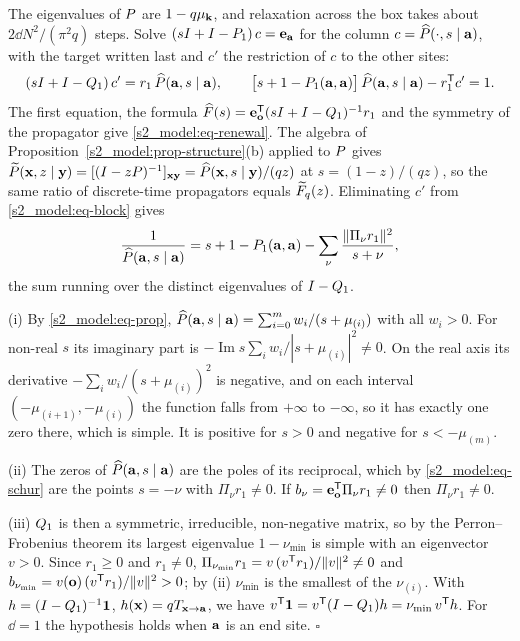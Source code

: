 The eigenvalues of $P$ are $1-q\mu_{\mathbf{k}}$, and relaxation across the box takes about $2\dd N^{2}/(\pi^{2}q)$ steps.
Solve $(sI+I-P_1)\,c=\mathbf{e}_{\mathbf{a}}$ for the column $c=\widehat{P}(\cdot,s\mid\mathbf{a})$, with the target written last and $c'$
the restriction of $c$ to the other sites:
\begin{equation}\label{s2_model:eq-block}
  (sI+I-Q_1)\,c'=r_1\,\widehat{P}(\mathbf{a},s\mid\mathbf{a}),\qquad
  \bigl[s+1-P_1(\mathbf{a},\mathbf{a})\bigr]\,\widehat{P}(\mathbf{a},s\mid\mathbf{a})-r_1^{\mathsf{T}}c'=1 .
\end{equation}
The first equation, the formula $\widehat{F}(s)=\mathbf{e}_{\mathbf{o}}^{\mathsf{T}}(sI+I-Q_1)^{-1}r_1$ and the symmetry of the propagator give
\eqref{s2_model:eq-renewal}. The algebra of Proposition~\ref{s2_model:prop-structure}(b) applied to $P$ gives
$\widetilde{P}(\mathbf{x},z\mid\mathbf{y})=[(I-zP)^{-1}]_{\mathbf{x}\mathbf{y}}=\widehat{P}(\mathbf{x},s\mid\mathbf{y})/(qz)$ at $s=(1-z)/(qz)$, so the same ratio of
discrete-time propagators equals $\widetilde{F}_q(z)$. Eliminating $c'$ from \eqref{s2_model:eq-block} gives
\begin{equation}\label{s2_model:eq-schur}
  \frac{1}{\widehat{P}(\mathbf{a},s\mid\mathbf{a})}=s+1-P_1(\mathbf{a},\mathbf{a})-\sum_{\nu}\frac{\lVert\Pi_\nu r_1\rVert^{2}}{s+\nu},
\end{equation}
the sum running over the distinct eigenvalues of $I-Q_1$.

(i) By \eqref{s2_model:eq-prop}, $\widehat{P}(\mathbf{a},s\mid\mathbf{a})=\sum_{i=0}^{m}w_i/(s+\mu_{(i)})$ with all $w_i>0$. For non-real
$s$ its imaginary part is $-\operatorname{Im}s\sum_i w_i/|s+\mu_{(i)}|^{2}\neq0$. On the real axis its derivative
$-\sum_i w_i/(s+\mu_{(i)})^{2}$ is negative, and on each interval $(-\mu_{(i+1)},-\mu_{(i)})$ the function falls from
$+\infty$ to $-\infty$, so it has exactly one zero there, which is simple. It is positive for $s>0$ and negative for
$s<-\mu_{(m)}$.

(ii) The zeros of $\widehat{P}(\mathbf{a},s\mid\mathbf{a})$ are the poles of its reciprocal, which by \eqref{s2_model:eq-schur} are the
points $s=-\nu$ with $\Pi_\nu r_1\neq0$. If $b_\nu=\mathbf{e}_{\mathbf{o}}^{\mathsf{T}}\Pi_\nu r_1\neq0$ then $\Pi_\nu r_1\neq0$.

(iii) $Q_1$ is then a symmetric, irreducible, non-negative matrix, so by the Perron--Frobenius theorem its largest
eigenvalue $1-\nu_{\min}$ is simple with an eigenvector $v>0$. Since $r_1\ge0$ and $r_1\neq0$,
$\Pi_{\nu_{\min}}r_1=v\,(v^{\mathsf{T}}r_1)/\lVert v\rVert^{2}\neq0$ and $b_{\nu_{\min}}=v(\mathbf{o})\,(v^{\mathsf{T}}r_1)/\lVert v\rVert^{2}>0$;
by (ii) $\nu_{\min}$ is the smallest of the $\nu_{(i)}$. With $h=(I-Q_1)^{-1}\mathbf{1}$, $h(\mathbf{x})=qT_{\mathbf{x}\to\mathbf{a}}$, we have
$v^{\mathsf{T}}\mathbf{1}=v^{\mathsf{T}}(I-Q_1)h=\nu_{\min}\,v^{\mathsf{T}}h$. For $\dd=1$ the hypothesis holds when $\mathbf{a}$ is an end site.
\hfill$\square$

